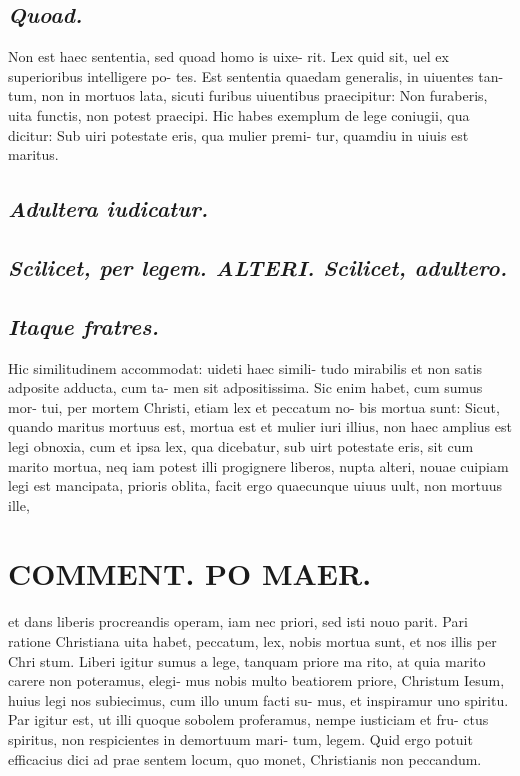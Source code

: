 \documentclass{article}
\begin{document}
\begin{pages}
\subsection*{\textit{Quoad. }}\pstart Non est haec sententia, sed quoad homo is uixe- rit. Lex quid sit, uel ex superioribus intelligere po- tes. Est sententia quaedam generalis, in uiuentes tan- tum, non in mortuos lata, sicuti furibus uiuentibus praecipitur: Non furaberis, uita functis, non potest praecipi. Hic habes exemplum de lege coniugii, qua dicitur: Sub uiri potestate eris, qua mulier premi- tur, quamdiu in uiuis est maritus.   \pend
{}
{}
\subsection*{\textit{Adultera iudicatur. }}
{}
\subsection*{\textit{Scilicet, per legem. ALTERI. Scilicet, adultero.  }}
{}
\subsection*{\textit{Itaque fratres. }}\pstart Hic similitudinem accommodat: uideti haec simili- tudo mirabilis et non satis adposite adducta, cum ta- men sit adpositissima. Sic enim habet, cum sumus mor- tui, per mortem Christi, etiam lex et peccatum no- bis mortua sunt: Sicut, quando maritus mortuus est, mortua est et mulier iuri illius, non haec amplius est legi obnoxia, cum et ipsa lex, qua dicebatur, sub uirt potestate eris, sit cum marito mortua, neq iam potest illi progignere liberos, nupta alteri, nouae cuipiam legi est mancipata, prioris oblita, facit ergo quaecunque uiuus uult, non mortuus ille,  \pend
\section*{COMMENT. PO MAER.  }\pstart et dans liberis procreandis operam, iam nec priori, sed isti nouo parit. Pari ratione Christiana uita habet, peccatum, lex, nobis mortua sunt, et nos illis per Chri stum. Liberi igitur sumus a lege, tanquam priore ma rito, at quia marito carere non poteramus, elegi- mus nobis multo beatiorem priore, Christum Iesum, huius legi nos subiecimus, cum illo unum facti su- mus, et inspiramur uno spiritu. Par igitur est, ut illi quoque sobolem proferamus, nempe iusticiam et fru- ctus spiritus, non respicientes in demortuum mari- tum, legem. Quid ergo potuit efficacius dici ad prae sentem locum, quo monet, Christianis non peccandum.  \pend
{}
{}

\end{pages}
\end{document}
